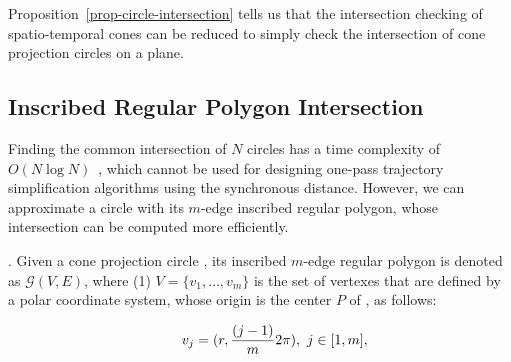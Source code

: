 

Proposition~\ref{prop-circle-intersection} tells us that the intersection checking of  spatio-temporal cones can be reduced to simply check the intersection of cone projection circles on a plane.


\subsection{Inscribed Regular Polygon Intersection}
\label{subsec-RPI}

Finding the common intersection of $N$ circles has a time complexity of ${O(N\log N)}$~\cite{Shamos:Circle}, which cannot be used
for designing one-pass trajectory simplification algorithms using the synchronous distance.
%
However, we can approximate a circle with its $m$-edge inscribed regular polygon, whose intersection can be computed more efficiently.




.
Given a cone projection circle , its inscribed $m$-edge regular polygon is denoted as $\mathcal{G}(V, E)$,
where (1) $V=\{v_1, \ldots, v_{m}\}$ is the set of vertexes that are defined by a polar coordinate system, whose origin is the center $P$ of \pcircle{}, as follows:


\vspace{-1ex}
\begin{equation*}
\label{equ-regular-polygon}
    \begin{aligned}
        \hspace{5ex}  v_j = (r, \frac{(j-1)}{m}2\pi), ~j \in [1, m], \\
    \end{aligned}
\end{equation*}
\vspace{-1ex}

